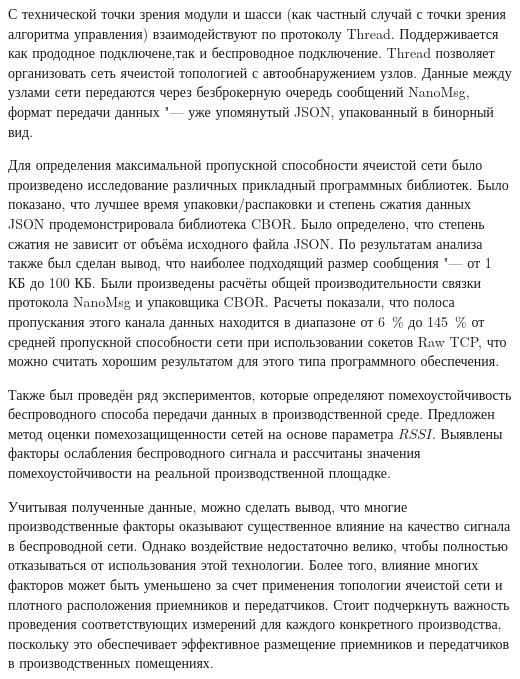 С технической точки зрения модули и шасси (как частный случай с точки зрения алгоритма управления) взаимодействуют по протоколу Thread. Поддерживается как прододное подключене,так и беспроводное подключение. Thread позволяет организовать сеть ячеистой топологией с автообнаружением узлов. Данные между узлами сети передаются через безброкерную очередь сообщений NanoMsg, формат передачи данных "--- уже упомянутый JSON, упакованный в бинорный вид.  

Для определения максимальной пропускной способности ячеистой сети было произведено исследование различных прикладный программных библиотек. Было показано, что лучшее время упаковки/распаковки и степень сжатия данных JSON продемонстрировала библиотека CBOR. Было определено, что степень сжатия не зависит от объёма исходного файла JSON. По результатам анализа также был сделан вывод, что наиболее подходящий размер сообщения "--- от 1 КБ до 100 КБ. Были произведены расчёты общей производительности связки протокола NanoMsg и упаковщика CBOR. Расчеты показали, что полоса пропускания этого канала данных находится в диапазоне от \SI{6}{\percent} до \SI{145}{\percent} от средней пропускной способности сети при использовании сокетов Raw TCP, что можно считать хорошим результатом для этого типа программного обеспечения.

Также был проведён ряд экспериментов, которые определяют помехоустойчивость беспроводного способа передачи данных в производственной среде. Предложен метод оценки помехозащищенности сетей на основе параметра $RSSI$. Выявлены факторы ослабления беспроводного сигнала и рассчитаны значения помехоустойчивости на реальной производственной площадке.

Учитывая полученные данные, можно сделать вывод, что многие производственные факторы оказывают существенное влияние на качество сигнала в беспроводной сети. Однако воздействие недостаточно велико, чтобы полностью отказываться от использования этой технологии. Более того, влияние многих факторов может быть уменьшено за счет применения топологии ячеистой сети и плотного расположения приемников и передатчиков. Стоит подчеркнуть важность проведения соответствующих измерений для каждого конкретного производства, поскольку это обеспечивает эффективное размещение приемников и передатчиков в производственных помещениях.

\FloatBarrier